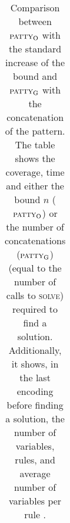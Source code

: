 \documentclass[11pt]{article}
\begin{document}
\begin{table}[tb]
{\begin{tabular}{|l||cc||cc||cc||cc||cc||cc||}
        \end{tabular}}
        \caption{Comparison between $\textsc{patty}_\mathrm{O}$ with the standard increase of the bound and $\textsc{patty}_\mathrm{G}$ with the concatenation of the pattern. The table shows the coverage, time and either the bound $n$ ($\textsc{patty}_\mathrm{O}$) or the number of concatenations ($\textsc{patty}_\mathrm{G}$) (equal to the number of calls to \textsc{solve}) required to find a solution. Additionally, it shows, in the last encoding before finding a solution, the number of variables, rules, and average number of variables per rule .}
        \label{tab:exp-search}
        \end{table}
        

            \begin{table}[tb]
            \centering
\end{table}
\end{document}
